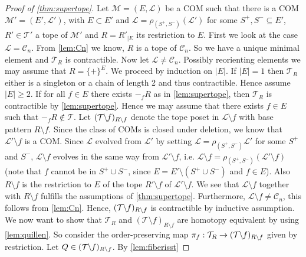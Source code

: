 \documentclass[12pt]{amsart}
\def\Tscr{{\mathcal T}}
\def\Lscr{{\mathcal L}}
\def\M{{\mathcal M}}
\theoremstyle{plain}
\numberwithin{Lemma}{\DefaultNumberTheoremWithin}
\numberwithin{Claim}{\DefaultNumberTheoremWithin}
\numberwithin{Theorem}{\DefaultNumberTheoremWithin}
\numberwithin{Corollary}{\DefaultNumberTheoremWithin}
\numberwithin{Proposition}{\DefaultNumberTheoremWithin}
\numberwithin{Conjecture}{\DefaultNumberTheoremWithin}
\numberwithin{Situation}{\DefaultNumberTheoremWithin}
\numberwithin{Note}{\DefaultNumberTheoremWithin}
\theoremstyle{definition}
\numberwithin{Definition}{\DefaultNumberTheoremWithin}
\theoremstyle{definition}
\numberwithin{Question}{\DefaultNumberTheoremWithin}
\theoremstyle{definition}
\numberwithin{Problem}{\DefaultNumberTheoremWithin}
\theoremstyle{remark} \newtheorem{Remark}{Remark}
\numberwithin{Remark}{\DefaultNumberTheoremWithin}
\theoremstyle{remark}
\numberwithin{Example}{\DefaultNumberTheoremWithin}
\numberwithin{Case}{Lemma}
\numberwithin{Step}{Lemma}
\begin{document}
\begin{proof}[Proof of \ref{thm:supertope}] Let $\M=(E,\mathcal{L})$ be a COM such that there is a COM $\M'=(E',\mathcal{L'})$, with $E\subset E'$ and $\mathcal{L} = \rho_{(S^+,S^-)}(\Lscr')$ for some $S^+,S^- \subseteq E'$, $R'\in \Tscr'$ a tope of $\M'$ and $R=R'_{|E}$ its restriction to $E$. First we look at the case $\mathcal{L}=\mathcal{C}_n$. From \ref{lem:Cn} we know, $R$ is a tope of $\mathcal{C}_n$. So we have a unique minimal element and $\Tscr_R$ is contractible.
Now let $\mathcal{L} \neq \mathcal{C}_n$. Possibly reorienting
elements we may assume that $R=\{+\}^E$. We proceed by induction on
  $|E|$. If $|E|=1$ then $\Tscr_R$ either is a singleton or a chain of
  length 2 and thus contractible. Hence assume $|E| \ge 2$. If for
  all $f \in E$ there exists $-_{f}R$ as in \ref{lem:supertope}, then
  $\Tscr_R$ is contractible by \ref{lem:supertope}. Hence we may
  assume that there exists $f \in E$ such that $-_{f}R \not \in \Tscr$. Let $(\Tscr\hspace{-.1cm}\setminus \hspace{-.1cm}f)_{R \setminus f}$ denote the tope poset in $\Lscr \setminus f$ with base pattern $R \setminus f$. Since the class of COMs is closed under deletion, we know that $\Lscr'\setminus f$ is a COM. Since $\mathcal{L}$ evolved from $\mathcal{L}'$ by setting $\Lscr= \rho_{(S^+,S^-)}\Lscr'$ for some $S^+$ and $S^-$, $\Lscr \setminus f$ evolves in the same way from $\Lscr'\setminus f$, i.e. $\Lscr \setminus f = \rho_{(S^+,S^-)}(\Lscr'\setminus f)$ (note that $f$ cannot be in $S^+ \cup S^-$, since $E=E' \setminus (S^+ \cup S^-)$ and $f \in E$). Also $R \setminus f$ is the restriction to $E$ of the tope $R'\setminus f$ of $\Lscr'\setminus f$. We see that $\Lscr \setminus f$ together with $R \setminus f$ fulfills the assumptions of \ref{thm:supertope}. Furthermore, $\Lscr \setminus f \neq \mathcal{C}_n$, this follows from \ref{lem:Cn}. Hence,
  $(\Tscr\hspace{-.1cm}\setminus \hspace{-.1cm}f)_{R \setminus f}$ is contractible by inductive
  assumption.  
  We now want to show that $\Tscr_R$ and $(\Tscr\setminus f)_{R \setminus f}$ are homotopy equivalent by using \ref{lem:quillen}. So consider the order-preserving map $\pi_{f}:\Tscr_R \to (\Tscr\hspace{-.1cm}\setminus \hspace{-.1cm}f)_{R \setminus f}$ given by
  restriction. Let $Q \in (\Tscr\hspace{-.1cm}\setminus \hspace{-.1cm}f)_{R \setminus f}$. By \ref{lem:fiberisst}

\end{proof}
\end{document}
